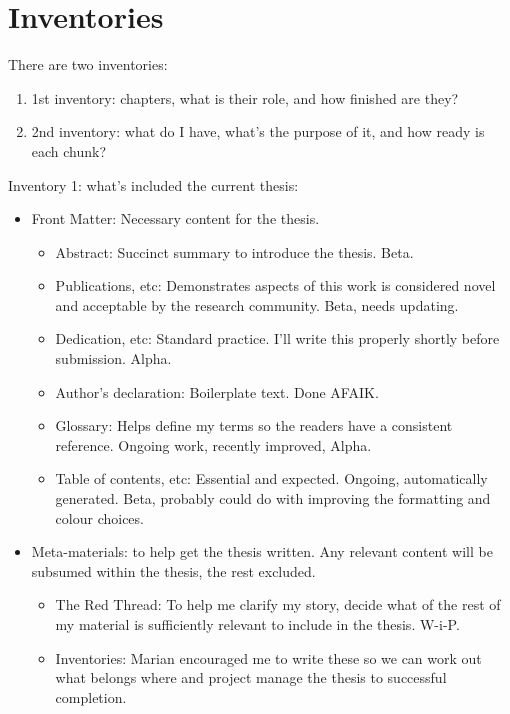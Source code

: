 \section{Inventories}
\label{section_inventories}
There are two inventories:
\begin{enumerate}
    \item 1st inventory: chapters, what is their role, and how finished are they?
    \item 2nd inventory: what do I have, what's the purpose of it, and how ready is each chunk?
\end{enumerate}

Inventory 1: what's included the current thesis:
\begin{itemize}
    \item Front Matter: Necessary content for the thesis.
    \begin{itemize}
        \item Abstract: Succinct summary to introduce the thesis. Beta.
        \item Publications, etc: Demonstrates aspects of this work is considered novel and acceptable by the research community. Beta, needs updating.
        \item Dedication, etc: Standard practice. I'll write this properly shortly before submission. Alpha.
        \item Author's declaration: Boilerplate text. Done AFAIK.
        \item Glossary: Helps define my terms so the readers have a consistent reference. Ongoing work, recently improved, Alpha.
        \item Table of contents, etc: Essential and expected. Ongoing, automatically generated. Beta, probably could do with improving the formatting and colour choices. 
    \end{itemize}

    \item Meta-materials: to help get the thesis written. Any relevant content will be subsumed within the thesis, the rest excluded.
    \begin{itemize}
        \item The Red Thread: To help me clarify my story, decide what of the rest of my material is sufficiently relevant to include in the thesis. W-i-P.
        \item Inventories: Marian encouraged me to write these so we can work out what belongs where and project manage the thesis to successful completion.
    \end{itemize}
    

\end{itemize}
